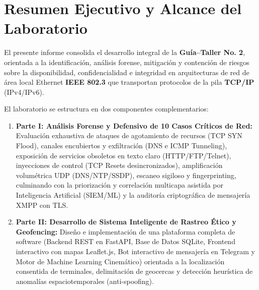 \documentclass[11pt,letterpaper]{article}
\begin{document}
\newpage
\tableofcontents
\newpage

\section{Resumen Ejecutivo y Alcance del Laboratorio}

El presente informe consolida el desarrollo integral de la \textbf{Guía--Taller No. 2}, orientada a la identificación, análisis forense, mitigación y contención de riesgos sobre la disponibilidad, confidencialidad e integridad en arquitecturas de red de área local Ethernet \textbf{IEEE 802.3} que transportan protocolos de la pila \textbf{TCP/IP} (IPv4/IPv6).

El laboratorio se estructura en dos componentes complementarios:
\begin{enumerate}
    \item \textbf{Parte I: Análisis Forense y Defensivo de 10 Casos Críticos de Red:} Evaluación exhaustiva de ataques de agotamiento de recursos (TCP SYN Flood), canales encubiertos y exfiltración (DNS e ICMP Tunneling), exposición de servicios obsoletos en texto claro (HTTP/FTP/Telnet), inyecciones de control (TCP Resets desincronizados), amplificación volumétrica UDP (DNS/NTP/SSDP), escaneo sigiloso y fingerprinting, culminando con la priorización y correlación multicapa asistida por Inteligencia Artificial (SIEM/ML) y la auditoría criptográfica de mensajería XMPP con TLS.
    \item \textbf{Parte II: Desarrollo de Sistema Inteligente de Rastreo Ético y Geofencing:} Diseño e implementación de una plataforma completa de software (Backend REST en FastAPI, Base de Datos SQLite, Frontend interactivo con mapas Leaflet.js, Bot interactivo de mensajería en Telegram y Motor de Machine Learning Cinemático) orientada a la localización consentida de terminales, delimitación de geocercas y detección heurística de anomalías espaciotemporales (anti-spoofing).
\end{enumerate}
\end{document}
